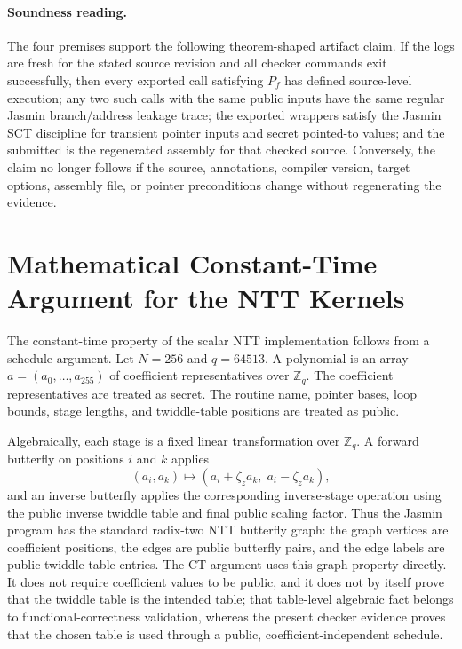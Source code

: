 \documentclass[10pt,twocolumn]{article}
\newcommand{\Zq}{\mathbb{Z}_q}
\begin{document}
\paragraph{Soundness reading.}
The four premises support the following theorem-shaped artifact claim.  If the
logs are fresh for the stated source revision and all checker commands exit
successfully, then every exported call satisfying \(P_f\) has defined
source-level execution; any two such calls with the same public inputs have the
same regular Jasmin branch/address leakage trace; the exported wrappers satisfy
the Jasmin SCT discipline for transient pointer inputs and secret pointed-to
values; and the submitted  is the regenerated assembly for that
checked source.  Conversely, the claim no longer follows if the source,
annotations, compiler version, target options, assembly file, or pointer
preconditions change without regenerating the evidence.

\section{Mathematical Constant-Time Argument for the NTT Kernels}

The constant-time property of the scalar NTT implementation follows from a
schedule argument.  Let \(N=256\) and \(q=64513\).  A polynomial is an array
\(a=(a_0,\ldots,a_{255})\) of coefficient representatives over \(\Zq\).  The
coefficient representatives are treated as secret.  The routine name, pointer
bases, loop bounds, stage lengths, and twiddle-table positions are treated as
public.

Algebraically, each stage is a fixed linear transformation over \(\Zq\).  A
forward butterfly on positions \(i\) and \(k\) applies
\[
  (a_i,a_k)\longmapsto (a_i+\zeta_z a_k,\; a_i-\zeta_z a_k),
\]
and an inverse butterfly applies the corresponding inverse-stage operation
using the public inverse twiddle table and final public scaling factor.  Thus
the Jasmin program has the standard radix-two NTT butterfly graph: the graph
vertices are coefficient positions, the edges are public butterfly pairs, and
the edge labels are public twiddle-table entries.  The CT argument uses this
graph property directly.  It does not require coefficient values to be public,
and it does not by itself prove that the twiddle table is the intended table;
that table-level algebraic fact belongs to functional-correctness validation,
whereas the present checker evidence proves that the chosen table is used
through a public, coefficient-independent schedule.
\end{document}
